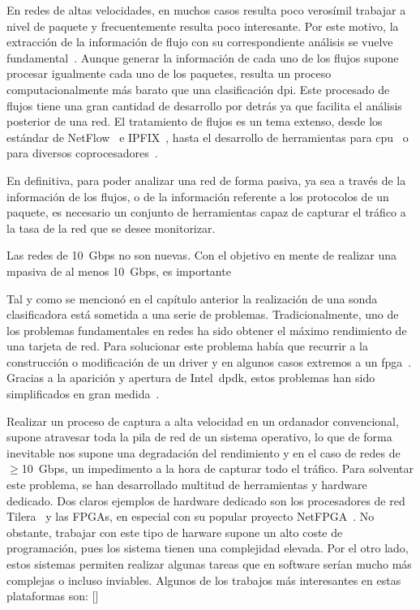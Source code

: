 En redes de altas velocidades, en muchos casos resulta poco verosímil trabajar a nivel de paquete y frecuentemente resulta poco interesante. Por este motivo, la extracción de la información de flujo con su correspondiente análisis se vuelve fundamental~\cite{fp:pedroth}. Aunque generar la información de cada uno de los flujos supone procesar igualmente cada uno de los paquetes, resulta un proceso computacionalmente más barato que una clasificación \gls{dpi}. Este procesado de flujos tiene una gran cantidad de desarrollo por detrás ya que facilita el análisis posterior de una red. El tratamiento de flujos es un tema extenso, desde los estándar de NetFlow~\cite{claise2004cisco,rt:netflow} e IPFIX~\cite{hofstede14surveys,claise2008specification}, hasta el desarrollo de herramientas para \gls{cpu}~\cite{mckeown2008openflow,kimCOMCOM06,garcia2014low,fp:pedroth} o para diversos coprocesadores~\cite{fp:marco}.

En definitiva, para poder analizar una red de forma pasiva, ya sea a través de la información de los flujos, o de la información referente a los protocolos de un paquete, es necesario un conjunto de herramientas capaz de capturar el tráfico a la tasa de la red que se desee monitorizar.


Las redes de 10~Gbps no son nuevas.
Con el objetivo en mente de realizar una \gls{mpasiva} de al menos 10~Gbps, es importante


Tal y como se mencionó en el capítulo anterior la realización de una sonda clasificadora está sometida a una serie de problemas.
Tradicionalmente, uno de los problemas fundamentales en redes ha sido obtener el máximo rendimiento de una tarjeta de red.
Para solucionar este problema había que recurrir a la construcción o modificación de un driver y en algunos casos extremos a un \gls{fpga}~.
Gracias a la aparición y apertura de Intel~\gls{dpdk}, estos problemas han sido simplificados en gran medida~\cite{dpdk:whitepaper:whydpdk}.

Realizar un proceso de captura a alta velocidad en un ordanador convencional, supone atravesar toda la pila de red de un sistema operativo, lo que de forma inevitable nos supone una degradación del rendimiento y en el caso de redes de $\geq$10~Gbps, un impedimento a la hora de capturar todo el tráfico. Para solventar este problema, se han desarrollado multitud de herramientas y hardware dedicado. Dos claros ejemplos de hardware dedicado son los procesadores de red Tilera~\cite{bib:tilera} y las FPGAs, en especial con su popular proyecto NetFPGA~\cite{dpdk:netfpga}. No obstante, trabajar con este tipo de harware supone un alto coste de programación, pues los sistema tienen una complejidad elevada. Por el otro lado, estos sistemas permiten realizar algunas tareas que en software serían mucho más complejas o incluso inviables. Algunos de los trabajos más interesantes en estas plataformas son: 
[]\cite{zazo2014tnt10g}




